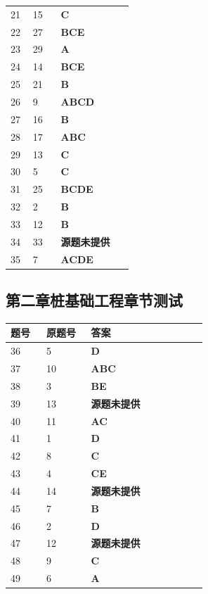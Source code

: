 \documentclass[UTF8,fontset=windows,11pt]{ctexart}
\begin{document}
\begin{longtable}{p{0.16\linewidth}p{0.2\linewidth}p{0.52\linewidth}}
21 & 15 & \textbf{\textcolor{answergreen}{C}} \\
22 & 27 & \textbf{\textcolor{answergreen}{BCE}} \\
23 & 29 & \textbf{\textcolor{answergreen}{A}} \\
24 & 14 & \textbf{\textcolor{answergreen}{BCE}} \\
25 & 21 & \textbf{\textcolor{answergreen}{B}} \\
26 & 9 & \textbf{\textcolor{answergreen}{ABCD}} \\
27 & 16 & \textbf{\textcolor{answergreen}{B}} \\
28 & 17 & \textbf{\textcolor{answergreen}{ABC}} \\
29 & 13 & \textbf{\textcolor{answergreen}{C}} \\
30 & 5 & \textbf{\textcolor{answergreen}{C}} \\
31 & 25 & \textbf{\textcolor{answergreen}{BCDE}} \\
32 & 2 & \textbf{\textcolor{answergreen}{B}} \\
33 & 12 & \textbf{\textcolor{answergreen}{B}} \\
34 & 33 & \textbf{\textcolor{answergreen}{源题未提供}} \\
35 & 7 & \textbf{\textcolor{answergreen}{ACDE}} \\
\end{longtable}
\vspace{0.4em}
\subsection*{第二章桩基础工程章节测试}
\begin{longtable}{p{0.16\linewidth}p{0.2\linewidth}p{0.52\linewidth}}
\textbf{\textcolor{examnavy}{题号}} & \textbf{\textcolor{examnavy}{原题号}} & \textbf{\textcolor{answergreen}{答案}} \\
\hline
36 & 5 & \textbf{\textcolor{answergreen}{D}} \\
37 & 10 & \textbf{\textcolor{answergreen}{ABC}} \\
38 & 3 & \textbf{\textcolor{answergreen}{BE}} \\
39 & 13 & \textbf{\textcolor{answergreen}{源题未提供}} \\
40 & 11 & \textbf{\textcolor{answergreen}{AC}} \\
41 & 1 & \textbf{\textcolor{answergreen}{D}} \\
42 & 8 & \textbf{\textcolor{answergreen}{C}} \\
43 & 4 & \textbf{\textcolor{answergreen}{CE}} \\
44 & 14 & \textbf{\textcolor{answergreen}{源题未提供}} \\
45 & 7 & \textbf{\textcolor{answergreen}{B}} \\
46 & 2 & \textbf{\textcolor{answergreen}{D}} \\
47 & 12 & \textbf{\textcolor{answergreen}{源题未提供}} \\
48 & 9 & \textbf{\textcolor{answergreen}{C}} \\
49 & 6 & \textbf{\textcolor{answergreen}{A}} \\
\end{longtable}
\vspace{0.4em}
\end{document}
